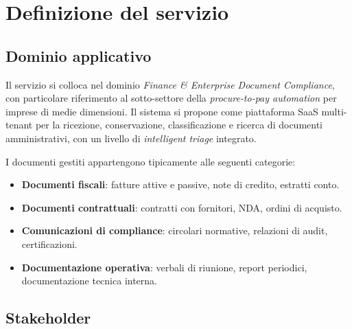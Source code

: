 \chapter{Definizione del servizio}
\label{chap:servizio}

\section{Dominio applicativo}
\label{sec:dominio}

Il servizio si colloca nel dominio \emph{Finance \& Enterprise Document Compliance},
con particolare riferimento al sotto-settore della \emph{procure-to-pay automation}
per imprese di medie dimensioni. Il sistema si propone come piattaforma SaaS multi-tenant
per la ricezione, conservazione, classificazione e ricerca di documenti amministrativi,
con un livello di \emph{intelligent triage} integrato.

I documenti gestiti appartengono tipicamente alle seguenti categorie:
\begin{itemize}[leftmargin=*]
    \item \textbf{Documenti fiscali}: fatture attive e passive, note di credito, estratti conto.
    \item \textbf{Documenti contrattuali}: contratti con fornitori, NDA, ordini di acquisto.
    \item \textbf{Comunicazioni di compliance}: circolari normative, relazioni di audit,
          certificazioni.
    \item \textbf{Documentazione operativa}: verbali di riunione, report periodici,
          documentazione tecnica interna.
\end{itemize}

\section{Stakeholder}
\label{sec:stakeholder}

